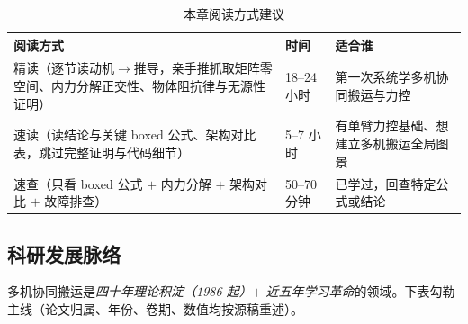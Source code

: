 \begin{table}[H]\centering\small
\caption{本章阅读方式建议}
\label{tab:cm-reading}
\begin{tabularx}{\linewidth}{LlL}
\toprule
阅读方式 & 时间 & 适合谁 \\
\midrule
精读（逐节读动机$\to$推导，亲手推抓取矩阵零空间、内力分解正交性、物体阻抗律与无源性证明） & 18--24 小时 & 第一次系统学多机协同搬运与力控 \\
速读（读结论与关键 boxed 公式、架构对比表，跳过完整证明与代码细节） & 5--7 小时 & 有单臂力控基础、想建立多机搬运全局图景 \\
速查（只看 boxed 公式 $+$ 内力分解 $+$ 架构对比 $+$ 故障排查） & 50--70 分钟 & 已学过，回查特定公式或结论 \\
\bottomrule
\end{tabularx}
\end{table}

\subsection*{科研发展脉络}
多机协同搬运是\emph{四十年理论积淀（1986 起）$+$ 近五年学习革命}的领域。下表勾勒主线（论文归属、年份、卷期、数值均按源稿重述）。

